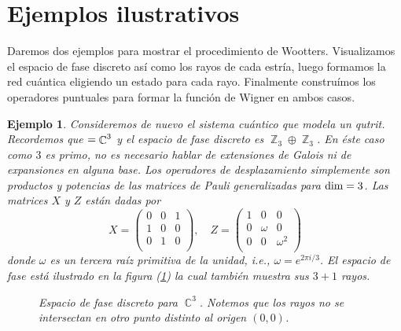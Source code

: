 \documentclass[a4paper]{report}
\DeclareMathOperator{\C}{\mathbb{C}}
\DeclareMathOperator{\Z}{\mathbb{Z}}
\let\H\relax
\DeclareMathOperator{\H}{\mathcal H}
\newtheorem{example}{Ejemplo}
\begin{document}
  \section{Ejemplos ilustrativos}

  Daremos dos ejemplos para mostrar el procedimiento de
  Wootters. Visualizamos el espacio de fase discreto así
  como los rayos de cada estría, luego formamos la red
  cuántica eligiendo un estado para cada rayo.  Finalmente
  construímos los operadores puntuales para formar la
  función de Wigner en ambos casos.

  \begin{example}
    Consideremos de nuevo el sistema cuántico que modela un
    qutrit. Recordemos que $\H = \C^{3}$ y el espacio de
    fase discreto es $\Z_3 \oplus \Z_3$. En éste caso como
    $3$ es primo, no es necesario hablar de extensiones de
    Galois ni de expansiones en alguna base. Los operadores
    de desplazamiento simplemente son productos y potencias
    de las matrices de Pauli generalizadas para $\dim \H =
    3$. Las matrices $X$ y $Z$ están dadas por
    \begin{equation}
      X = \begin{pmatrix} 
        0 & 0 & 1 \\
        1 & 0 & 0 \\
        0 & 1 & 0 \\
      \end{pmatrix},
      \quad
      Z = \begin{pmatrix} 
        1 & 0 & 0 \\
        0 & \omega & 0 \\
        0 & 0 & \omega^2 \\
      \end{pmatrix} 
    \end{equation}
    donde $\omega$ es un tercera raíz primitiva de la
    unidad, i.e., $\omega = e^{2\pi i / 3}$. El espacio de
    fase está ilustrado en la figura
    (\ref{fig:qutrit-phase-space}) la cual también muestra
    sus $3 + 1$ rayos. 
    \begin{figure}[ht]
      \centering
      \scalebox{0.6}{
        
      }
      \caption{Espacio de fase discreto para $\C^3$. Notemos
      que los rayos no se intersectan en otro punto distinto
      al origen $(0,0)$.}
      \label{fig:qutrit-phase-space}
    \end{figure}


\end{example}
\end{document}
